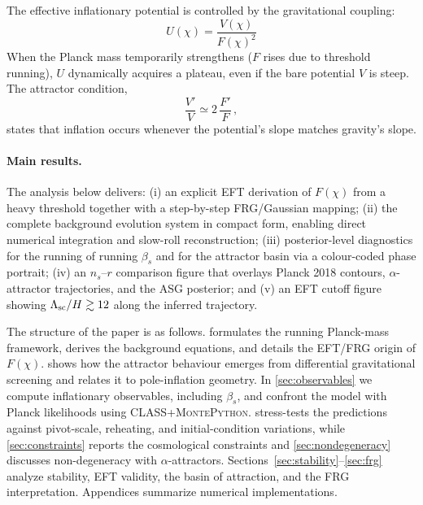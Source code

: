 \documentclass[11pt,a4paper]{article}
\begin{document}
\begin{tcolorbox}[colback=gray!5, colframe=gray!60, title={\textbf{Key relation: gravitational screening as the origin of inflation}}, fonttitle=\small]
The effective inflationary potential is controlled by the gravitational coupling:
\begin{equation}
\boxed{\;U(\chi)=\frac{V(\chi)}{F(\chi)^{2}}\;}
\tag{$\star$}
\end{equation}
When the Planck mass temporarily strengthens ($F$ rises due to threshold running), $U$ dynamically acquires a plateau, even if the bare potential $V$ is steep. The attractor condition,
\begin{equation}
\frac{V'}{V}\simeq 2\,\frac{F'}{F}\,,
\tag{$\star\star$}
\end{equation}
states that inflation occurs whenever the potential's slope matches gravity's slope.
\end{tcolorbox}

\paragraph{Main results.} The analysis below delivers: (i) an explicit EFT derivation of $F(\chi)$ from a heavy threshold together with a step-by-step FRG/Gaussian mapping; (ii) the complete background evolution system in compact form, enabling direct numerical integration and slow-roll reconstruction; (iii) posterior-level diagnostics for the running of running $\beta_s$ and for the attractor basin via a colour-coded phase portrait; (iv) an $n_s$--$r$ comparison figure that overlays Planck 2018 contours, $\alpha$-attractor trajectories, and the ASG posterior; and (v) an EFT cutoff figure showing $\Lambda_{\rm sc}/H \gtrsim 12$ along the inferred trajectory.

The structure of the paper is as follows.  formulates the running Planck-mass framework, derives the background equations, and details the EFT/FRG origin of $F(\chi)$.  shows how the attractor behaviour emerges from differential gravitational screening and relates it to pole-inflation geometry. In \cref{sec:observables} we compute inflationary observables, including $\beta_s$, and confront the model with Planck likelihoods using \textsc{CLASS}+\textsc{MontePython}.  stress-tests the predictions against pivot-scale, reheating, and initial-condition variations, while \cref{sec:constraints} reports the cosmological constraints and \cref{sec:nondegeneracy} discusses non-degeneracy with $\alpha$-attractors. Sections~\ref{sec:stability}--\ref{sec:frg} analyze stability, EFT validity, the basin of attraction, and the FRG interpretation. Appendices summarize numerical implementations.
\end{document}
